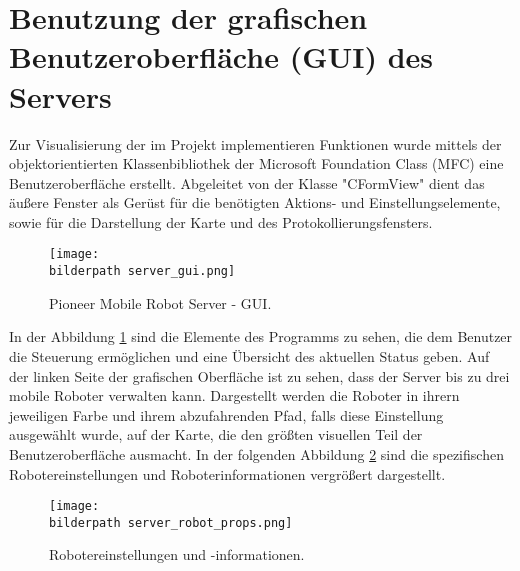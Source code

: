 \section{Benutzung der grafischen Benutzeroberfläche (GUI) des Servers} \label{serv:Gui}
Zur Visualisierung der im Projekt implementieren Funktionen wurde mittels der objektorientierten Klassenbibliothek der Microsoft Foundation Class (MFC) eine Benutzeroberfläche erstellt. Abgeleitet von der Klasse "CFormView" dient das äußere Fenster als Gerüst für die benötigten Aktions- und Einstellungselemente, sowie für die Darstellung der Karte und des Protokollierungsfensters. 

\begin{figure}[h]
		\centering
		\texttt{[image: \\bilderpath server\_gui.png]}
		\caption{Pioneer Mobile Robot Server - GUI.}
		\label{serv:fig:gui}
\end{figure}

In der Abbildung \ref{serv:fig:gui} sind die Elemente des Programms zu sehen, die dem Benutzer die Steuerung ermöglichen und eine Übersicht des aktuellen Status geben. Auf der linken Seite der grafischen Oberfläche ist zu sehen, dass der Server bis zu drei mobile Roboter verwalten kann. Dargestellt werden die Roboter in ihrern jeweiligen Farbe und ihrem abzufahrenden Pfad, falls diese Einstellung ausgewählt wurde, auf der Karte, die den größten visuellen Teil der Benutzeroberfläche ausmacht. In der folgenden Abbildung \ref{serv:fig:props} sind die spezifischen Robotereinstellungen und Roboterinformationen vergrößert dargestellt.\\

\begin{figure}[h]
	\centering
	\texttt{[image: \\bilderpath server\_robot\_props.png]}
	\caption{Robotereinstellungen und -informationen.}
	\label{serv:fig:props}
\end{figure}


